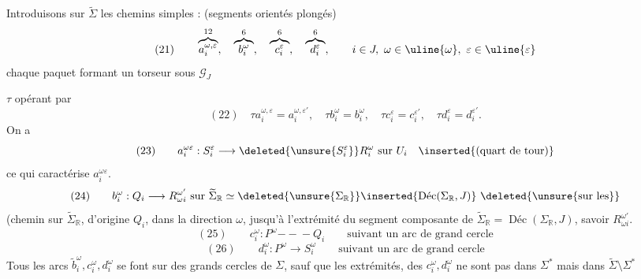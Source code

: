 Introduisons sur $\widetilde\Sigma$ les  chemins simples : (segments orientés plongés)
\[
(21)\qquad\overbrace{a_i^{\omega,\varepsilon}}^{12},\quad
\overbrace{b_i^\omega}^{6},\quad\overbrace{c_i^\varepsilon}^{6},\quad\overbrace{d_i^\varepsilon}^{6},\qquad
i\in J,\ \omega\in\uline{\omega},\ \varepsilon\in\uline{\varepsilon}
\]
chaque paquet  formant un torseur sous $\mathcal G_J$

$\tau$ opérant par
\[
(22)\quad \tau a_i^{\omega,\varepsilon}=a_i^{\omega,\varepsilon'},\quad
\tau b_i^\omega=b_i^\omega,\quad \tau c_i^\varepsilon=c_i^{\varepsilon'},\quad \tau d_i^\varepsilon=d_i^{\varepsilon'}.
\]
On a
\[
(23)\qquad a_i^{\omega\varepsilon}:S_i^\varepsilon\longrightarrow\deleted{\unsure{S_i^\varepsilon}}R_i^\omega\text{ sur }U_i\quad\inserted{(\text{quart de tour})}
\]
ce qui caractérise $a_i^{\omega\varepsilon}$. 
\[
(24)\qquad b_i^\omega:Q_i\longrightarrow R_{\omega i}^{\omega'}\text{ sur }\widetilde\Sigma_{\mathbb R}\simeq\deleted{\unsure{\Sigma_{\mathbb R}}}\inserted{\operatorname{\text{Déc}}(\Sigma_{\mathbb R},J)}\ \deleted{\unsure{\text{sur les}}}
\]
(chemin sur $\widetilde\Sigma_{\mathbb R}$, d'origine $Q_i$, dans la direction $\omega$, jusqu'à l'extrémité  du segment composante de $\widetilde\Sigma_{\mathbb R}=\operatorname{\text{Déc}}(\Sigma_{\mathbb R},J)$, savoir $R_{\omega i}^{\omega'}$.
\[
(25)\qquad c_i^\omega:P^\omega\mathrel{-\!\!\!-\!\!\!-}Q_i\qquad\text{suivant un arc de grand cercle}
\]
\[
(26)\qquad d_i^\omega:P^\omega\longrightarrow S_i^\omega\qquad\text{suivant un arc de grand cercle}
\]
Tous les arcs $\widetilde b_i^\omega,c_i^\omega,d_i^\omega$ se font sur des grands cercles de $\Sigma$, sauf que les extrémités, des $c_i^\omega,d_i^\omega$ ne sont pas dans $\Sigma^*$ mais dans  $\widetilde\Sigma\setminus\Sigma^*$
